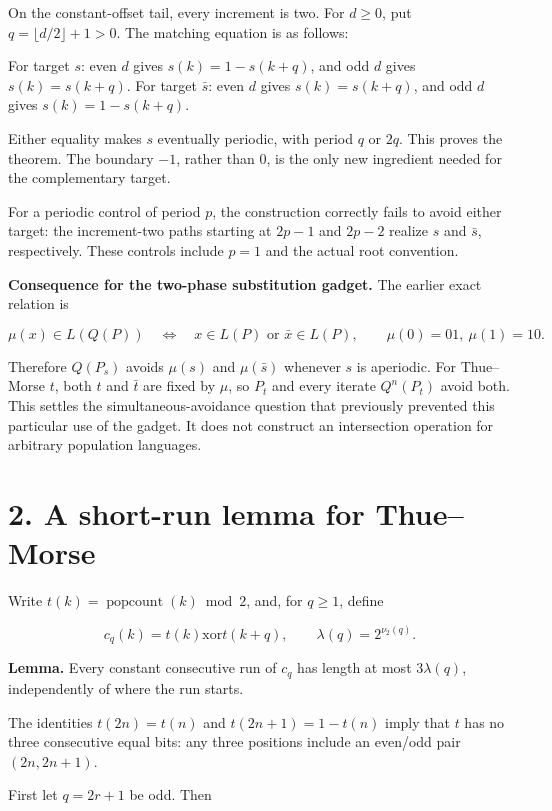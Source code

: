 \documentclass[
  11pt,
]{article}
\begin{document}
On the constant-offset tail, every increment is two. For \(d\ge0\), put
\(q=\lfloor d/2\rfloor+1>0\). The matching equation is as follows:

For target \(s\): even \(d\) gives \(s(k)=1-s(k+q)\), and odd \(d\)
gives \(s(k)=s(k+q)\). For target \(\bar s\): even \(d\) gives
\(s(k)=s(k+q)\), and odd \(d\) gives \(s(k)=1-s(k+q)\).

Either equality makes \(s\) eventually periodic, with period \(q\) or
\(2q\). This proves the theorem. The boundary \(-1\), rather than 0, is
the only new ingredient needed for the complementary target.

For a periodic control of period \(p\), the construction correctly fails
to avoid either target: the increment-two paths starting at \(2p-1\) and
\(2p-2\) realize \(s\) and \(\bar s\), respectively. These controls
include \(p=1\) and the actual root convention.

\textbf{Consequence for the two-phase substitution gadget.} The earlier
exact relation is

\[\mu(x)\in L(Q(P))\quad\Longleftrightarrow\quad
x\in L(P)\text{ or }\bar x\in L(P),\qquad \mu(0)=01,\ \mu(1)=10.\]

Therefore \(Q(P_s)\) avoids \(\mu(s)\) and \(\mu(\bar s)\) whenever
\(s\) is aperiodic. For Thue--Morse \(t\), both \(t\) and \(\bar t\) are
fixed by \(\mu\), so \(P_t\) and every iterate \(Q^n(P_t)\) avoid both.
This settles the simultaneous-avoidance question that previously
prevented this particular use of the gadget. It does not construct an
intersection operation for arbitrary population languages.

\section{2. A short-run lemma for
Thue--Morse}\label{a-short-run-lemma-for-thuemorse}

Write \(t(k)=\operatorname{popcount}(k)\bmod2\), and, for \(q\ge1\),
define

\[c_q(k)=t(k)\mathbin{\mathrm{xor}}t(k+q),\qquad
\lambda(q)=2^{\nu_2(q)}.\]

\textbf{Lemma.} Every constant consecutive run of \(c_q\) has length at
most \(3\lambda(q)\), independently of where the run starts.

The identities \(t(2n)=t(n)\) and \(t(2n+1)=1-t(n)\) imply that \(t\)
has no three consecutive equal bits: any three positions include an
even/odd pair \((2n,2n+1)\).

First let \(q=2r+1\) be odd. Then
\end{document}
